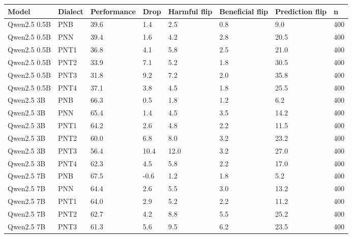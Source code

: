 \begin{tabular}{llllllll}
\toprule
       Model & Dialect & Performance & Drop & Harmful flip & Beneficial flip & Prediction flip &   n \\
\midrule
Qwen2.5 0.5B &     PNB &        39.6 &  1.4 &          2.5 &             0.8 &             9.0 & 400 \\
Qwen2.5 0.5B &     PNN &        39.4 &  1.6 &          4.2 &             2.8 &            20.5 & 400 \\
Qwen2.5 0.5B &    PNT1 &        36.8 &  4.1 &          5.8 &             2.5 &            21.0 & 400 \\
Qwen2.5 0.5B &    PNT2 &        33.9 &  7.1 &          5.2 &             1.8 &            30.5 & 400 \\
Qwen2.5 0.5B &    PNT3 &        31.8 &  9.2 &          7.2 &             2.0 &            35.8 & 400 \\
Qwen2.5 0.5B &    PNT4 &        37.1 &  3.8 &          4.5 &             1.8 &            25.5 & 400 \\
  Qwen2.5 3B &     PNB &        66.3 &  0.5 &          1.8 &             1.2 &             6.2 & 400 \\
  Qwen2.5 3B &     PNN &        65.4 &  1.4 &          4.5 &             3.5 &            14.2 & 400 \\
  Qwen2.5 3B &    PNT1 &        64.2 &  2.6 &          4.8 &             2.2 &            11.5 & 400 \\
  Qwen2.5 3B &    PNT2 &        60.0 &  6.8 &          8.0 &             3.2 &            23.2 & 400 \\
  Qwen2.5 3B &    PNT3 &        56.4 & 10.4 &         12.0 &             3.2 &            27.0 & 400 \\
  Qwen2.5 3B &    PNT4 &        62.3 &  4.5 &          5.8 &             2.2 &            17.0 & 400 \\
  Qwen2.5 7B &     PNB &        67.5 & -0.6 &          1.2 &             1.8 &             5.2 & 400 \\
  Qwen2.5 7B &     PNN &        64.4 &  2.6 &          5.5 &             3.0 &            13.2 & 400 \\
  Qwen2.5 7B &    PNT1 &        64.0 &  2.9 &          5.2 &             2.2 &            11.2 & 400 \\
  Qwen2.5 7B &    PNT2 &        62.7 &  4.2 &          8.8 &             5.5 &            25.2 & 400 \\
  Qwen2.5 7B &    PNT3 &        61.3 &  5.6 &          9.5 &             6.2 &            23.5 & 400 \\

\end{tabular}

